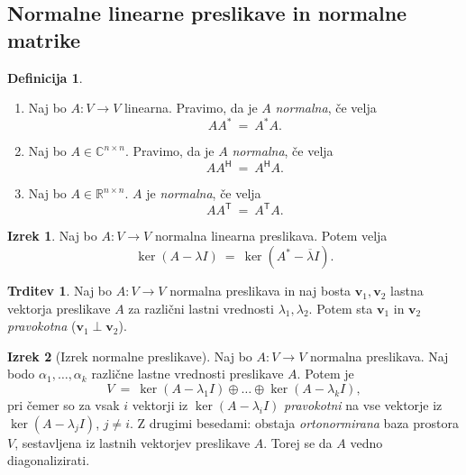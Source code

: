 \documentclass[11pt]{article}
\newcommand{\R}{\mathbb{R}}
\newcommand{\vv}{\mathbf{v}}
\newcommand{\0}{\mathbf{0}}
\newcommand{\T}{\mathsf{T}}
\renewcommand{\H}{\mathsf{H}}
\theoremstyle{definition}
\newtheorem{definicija}{Definicija}[section]
\theoremstyle{definition}
\newtheorem{trditev}{Trditev}[section]
\theoremstyle{definition}
\newtheorem{izrek}{Izrek}[section]
\theoremstyle{definition}
\begin{document}

\subsection{Normalne linearne preslikave in normalne matrike}
\vspace{0.5cm}

\begin{definicija}
~
\begin{enumerate}

\item Naj bo $A: V \rightarrow V$ linearna. Pravimo, da je $A$ \textit{normalna}, če velja
$$AA^* ~=~ A^*A.$$

\item Naj bo $A\in\mathbb{C}^{n \times n}$. Pravimo, da je $A$ \textit{normalna}, če velja
$$AA^\H ~=~ A^\H A.$$

\item Naj bo $A \in \R^{n \times n}$. $A$ je \textit{normalna}, če velja
$$AA^\T ~=~ A^\T A.$$

\end{enumerate}

\end{definicija}
\vspace{0.5cm}

\begin{izrek}

Naj bo $A: V \rightarrow V$ normalna linearna preslikava. Potem velja
$$\ker (A-\lambda I) ~=~ \ker (A^*-\overline{\lambda} I).$$

\end{izrek}
\vspace{0.5cm}

\begin{trditev}

Naj bo $A: V \rightarrow V$ normalna preslikava in naj bosta $\vv_1,\vv_2$ lastna vektorja preslikave $A$ za različni lastni vrednosti $\lambda_1,\lambda_2$. Potem sta $\vv_1$ in $\vv_2$ \textit{pravokotna} ($\vv_1 \perp \vv_2$).

\end{trditev}
\vspace{0.5cm}

\begin{izrek}[Izrek normalne preslikave]

Naj bo $A: V \rightarrow V$ normalna preslikava. Naj bodo $\alpha_1,\ldots,\alpha_k$ različne lastne vrednosti preslikave $A$. Potem je
$$V ~=~ \ker(A-\lambda_1 I) \oplus \ldots \oplus \ker(A-\lambda_k I),$$
pri čemer so za vsak $i$ vektorji iz $\ker(A-\lambda_i I)$ \textit{pravokotni} na vse vektorje iz $\ker(A-\lambda_j I)$, $j\neq i$. Z drugimi besedami: obstaja \textit{ortonormirana} baza prostora $V$, sestavljena iz lastnih vektorjev preslikave $A$. Torej se da $A$ vedno diagonalizirati.

\end{izrek}
\vspace{0.5cm}
\end{document}
